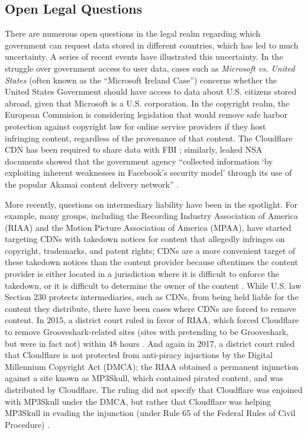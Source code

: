 \subsection{Open Legal Questions}
There are numerous open questions in the legal realm regarding which government can request data stored in different countries, which 
has led to much uncertainty.  A series of recent events have illustrated this uncertainty.  In the struggle over government access to 
user data, cases such as {\it Microsoft vs. United States} (often known as the ``Microsoft Ireland Case'') concerns whether the United 
States Government should have access to data about U.S. citizens stored abroad, given that Microsoft is a U.S. corporation.  In the 
copyright realm, the European Commision is considering legislation that would remove safe harbor protection against copyright law for 
online service providers if they host infringing content, regardless of the provenance of that content.  The Cloudflare CDN has been required
to share data with FBI \cite{cloudflare_nsl}; similarly, leaked NSA documents showed that the government agency ``collected information `by exploiting inherent 
weaknesses in Facebook's security model' through its use of the popular Akamai content delivery network'' \cite{facebook_surv}.

More recently, questions on intermediary liability have been in the spotlight.  For example, many groups, including the Recording Industry 
Association of America (RIAA) and the Motion Picture Association of America (MPAA), have started targeting CDNs with takedown notices for 
content that allegedly infringes on copyright, trademarks, and patent rights; CDNs are a more convenient target of these takedown notices than 
the content provider because oftentimes the content provider is either located in a jurisdiction where it is difficult to enforce the takedown, 
or it is difficult to determine the owner of the content \cite{medium_copyright,eff_copyright}.  While U.S. law Section 230 protects intermediaries, such as CDNs, from being held 
liable for the content they distribute, there have been cases where CDNs are forced to remove content.  In 2015, a district court ruled in 
favor of RIAA, which forced Cloudflare to remove Grooveshark-related sites (sites with pretending to be Grooveshark, but were in fact not) within 48 hours \cite{techdirt_copyright}.  
And again in 2017, a district court ruled that Cloudflare is not protected from anti-piracy injuctions by the Digital Millennium Copyright Act (DMCA); the 
RIAA obtained a permanent injunction against a site known as MP3Skull, which contained pirated content, and was distributed by Cloudflare.  The ruling 
did not specify that Cloudflare was enjoined with MP3Skull under the DMCA, but rather that Cloudflare was helping MP3Skull in evading the injunction (under 
Rule 65 of the Federal Rules of Civil Procedure) \cite{stack_copyright}.

